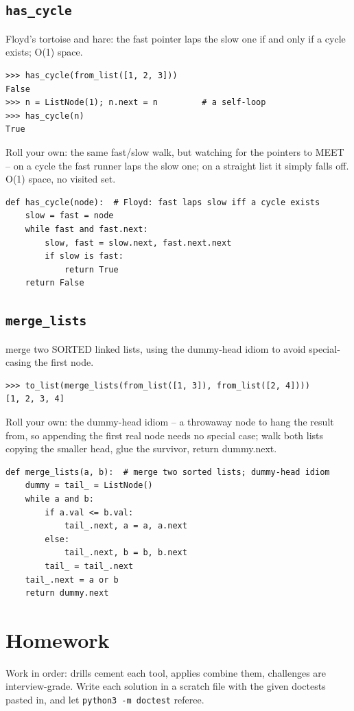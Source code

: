 \documentclass[10pt,letterpaper]{book}
\begin{document}
\subsection{\texttt{has\_cycle}}\label{def:has-cycle}
Floyd's tortoise and hare: the fast pointer laps the slow one if and only if a cycle exists; O(1) space.
\begin{lstlisting}[style=ex]
>>> has_cycle(from_list([1, 2, 3]))
False
>>> n = ListNode(1); n.next = n         # a self-loop
>>> has_cycle(n)
True
\end{lstlisting}

Roll your own: the same fast/slow walk, but watching for the pointers to MEET -- on a cycle the fast runner laps the slow one; on a straight list it simply falls off. O(1) space, no visited set.

\begin{lstlisting}[style=ex]
def has_cycle(node):  # Floyd: fast laps slow iff a cycle exists
    slow = fast = node
    while fast and fast.next:
        slow, fast = slow.next, fast.next.next
        if slow is fast:
            return True
    return False
\end{lstlisting}
\subsection{\texttt{merge\_lists}}\label{def:merge-lists}
merge two SORTED linked lists, using the dummy-head idiom to avoid special-casing the first node.
\begin{lstlisting}[style=ex]
>>> to_list(merge_lists(from_list([1, 3]), from_list([2, 4])))
[1, 2, 3, 4]
\end{lstlisting}

Roll your own: the dummy-head idiom -- a throwaway node to hang the result from, so appending the first real node needs no special case; walk both lists copying the smaller head, glue the survivor, return dummy.next.

\begin{lstlisting}[style=ex]
def merge_lists(a, b):  # merge two sorted lists; dummy-head idiom
    dummy = tail_ = ListNode()
    while a and b:
        if a.val <= b.val:
            tail_.next, a = a, a.next
        else:
            tail_.next, b = b, b.next
        tail_ = tail_.next
    tail_.next = a or b
    return dummy.next
\end{lstlisting}
\section{Homework}
Work in order: drills cement each tool, applies combine them,
challenges are interview-grade. Write each solution in a scratch file with
the given doctests pasted in, and let \texttt{python3 -m doctest} referee.
\end{document}
